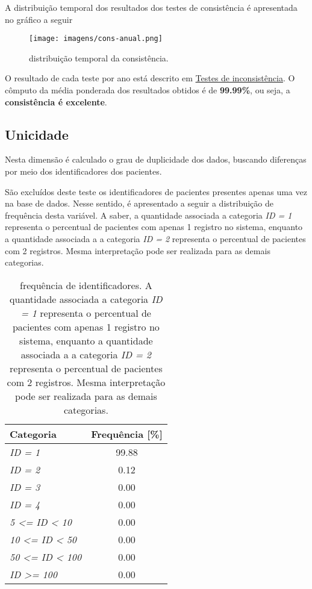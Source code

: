 \documentclass[
  12,
  table]{proadi}
\begin{document}
A distribuição temporal dos resultados dos testes de consistência é
apresentada no gráfico a seguir

\begin{figure}
\centering
\texttt{[image: imagens/cons-anual.png]}
\caption{distribuição temporal da consistência.}
\end{figure}

O resultado de cada teste por ano está descrito em
\protect\hyperlink{testes-de-inconsistuxeancia}{Testes de
inconsistência}. O cômputo da média ponderada dos resultados obtidos é
de \textbf{99.99\%}, ou seja, a \textbf{consistência é excelente}.

\hypertarget{unicidade}{%
\subsection{Unicidade}\label{unicidade}}

\label{sub:unicidade}

Nesta dimensão é calculado o grau de duplicidade dos dados, buscando
diferenças por meio dos identificadores dos pacientes.

São excluídos deste teste os identificadores de pacientes presentes
apenas uma vez na base de dados. Nesse sentido, é apresentado a seguir a
distribuição de frequência desta variável. A saber, a quantidade
associada a categoria \emph{ID = 1} representa o percentual de pacientes
com apenas 1 registro no sistema, enquanto a quantidade associada a a
categoria \emph{ID = 2} representa o percentual de pacientes com 2
registros. Mesma interpretação pode ser realizada para as demais
categorias.

\begin{table}[H]

\caption{\label{tab:unnamed-chunk-18}frequência de identificadores. A quantidade associada a categoria \textit{ID = 1} representa o percentual de pacientes com apenas 1 registro no sistema, enquanto a quantidade associada a a categoria \textit{ID = 2} representa o percentual de pacientes com 2 registros. Mesma interpretação pode ser realizada para as demais categorias.}
\centering
\fontsize{10}{12}\selectfont
\begin{tabular}[t]{>{}lc}
\toprule
Categoria & Frequência [\%]\\
\midrule
\em{ID = 1} & 99.88\\
\em{ID = 2} & 0.12\\
\em{ID = 3} & 0.00\\
\em{ID = 4} & 0.00\\
\em{5 <= ID < 10} & 0.00\\
\addlinespace
\em{10 <= ID < 50} & 0.00\\
\em{50 <= ID < 100} & 0.00\\
\em{ID >= 100} & 0.00\\
\bottomrule
\end{tabular}
\end{table}
\end{document}
